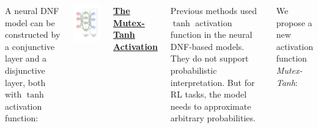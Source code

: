 \documentclass{tikzposter} %
\begin{document}
\begin{columns}
{        \vspace{0.5em}

        A neural DNF model can be constructed by a conjunctive layer and a
        disjunctive layer, both with $\tanh$ activation function:

        \vspace{-1em}

        \begin{center}
            \includegraphics[width=0.6\colwidth]{img/ndnf-rl-ndnf}
        \end{center}

        \vspace{-1em}

        {\color{ImperialBlue}\underline{\sffamily\textbf{The Mutex-Tanh
                    Activation}}}

        \vspace{0.5em}

        Previous methods \cite{pix2rule,ns-classifications} used $\tanh$
        activation function in the neural DNF-based models. They do not support
        probabilistic interpretation. But for RL tasks, the model needs to
        approximate arbitrary probabilities.

        We propose a new activation function
        \emph{\color{ImperialBlue}Mutex-Tanh}:

}
\end{columns}
\end{document}
